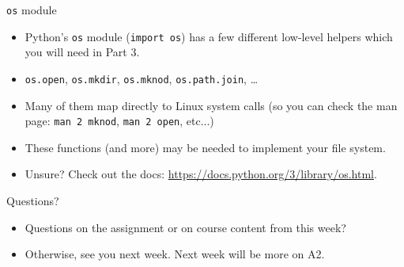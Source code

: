 \documentclass[notes]{beamer}
\begin{document}
\begin{frame}{\texttt{os} module}
    \begin{itemize}
        \item Python's \texttt{os} module (\texttt{import os}) has a few different low-level helpers which you will need in Part 3.
        \item \texttt{os.open}, \texttt{os.mkdir}, \texttt{os.mknod}, \texttt{os.path.join}, \dots
        \item Many of them map directly to Linux system calls (so you can check the man page: \texttt{man 2 mknod}, \texttt{man 2 open}, etc...)
        \item These functions (and more) may be needed to implement your file system.
        \item Unsure? Check out the docs: \url{https://docs.python.org/3/library/os.html}.
    \end{itemize}
\end{frame}
\begin{frame}{Questions?}
    \begin{itemize}
        \item Questions on the assignment or on course content from this week?
        \item Otherwise, see you next week. Next week will be more on A2.
    \end{itemize}
\end{frame}
\end{document}
